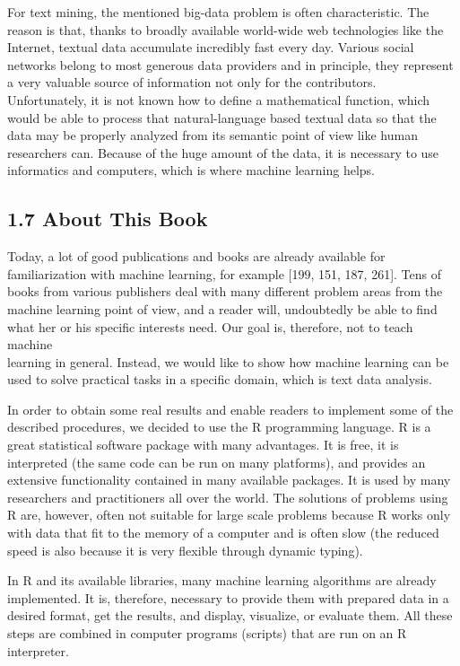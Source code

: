 \documentclass[10pt]{book}
\begin{document}
For text mining, the mentioned big-data problem is often characteristic. The reason is that, thanks to broadly available world-wide web technologies like the Internet, textual data accumulate incredibly fast every day. Various social networks belong to most generous data providers and in principle, they represent a very valuable source of information not only for the contributors. Unfortunately, it is not known how to define a mathematical function, which would be able to process that natural-language based textual data so that the data may be properly analyzed from its semantic point of view like human researchers can. Because of the huge amount of the data, it is necessary to use informatics and computers, which is where machine learning helps.

\subsection*{1.7 About This Book}
Today, a lot of good publications and books are already available for familiarization with machine learning, for example [199, 151, 187, 261]. Tens of books from various publishers deal with many different problem areas from the machine learning point of view, and a reader will, undoubtedly be able to find what her or his specific interests need. Our goal is, therefore, not to teach machine\\
learning in general. Instead, we would like to show how machine learning can be used to solve practical tasks in a specific domain, which is text data analysis.

In order to obtain some real results and enable readers to implement some of the described procedures, we decided to use the R programming language. R is a great statistical software package with many advantages. It is free, it is interpreted (the same code can be run on many platforms), and provides an extensive functionality contained in many available packages. It is used by many researchers and practitioners all over the world. The solutions of problems using R are, however, often not suitable for large scale problems because R works only with data that fit to the memory of a computer and is often slow (the reduced speed is also because it is very flexible through dynamic typing).

In R and its available libraries, many machine learning algorithms are already implemented. It is, therefore, necessary to provide them with prepared data in a desired format, get the results, and display, visualize, or evaluate them. All these steps are combined in computer programs (scripts) that are run on an R interpreter.
\end{document}

